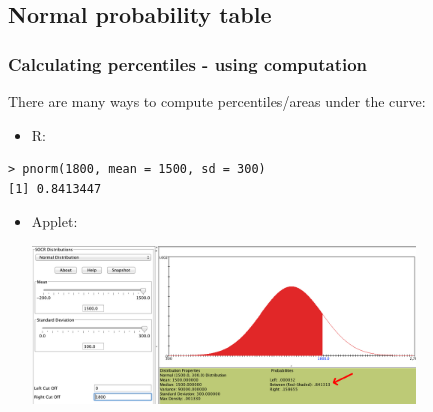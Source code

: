 
%
%
%
%
%
%

\subsection{Normal probability table}


\begin{frame}[fragile]
\frametitle{Calculating percentiles - using computation}

There are many ways to compute percentiles/areas under the curve:

\begin{itemize}
\item R:
\end{itemize}
\begin{beamerboxesrounded}[shadow = false, lower = code body]{}
{\small \begin{verbatim}
> pnorm(1800, mean = 1500, sd = 300)
[1] 0.8413447
\end{verbatim}
}
\end{beamerboxesrounded}
\begin{itemize}
\item Applet: {\small {}}
\begin{center}
\includegraphics[width=0.8\textwidth]{3-1_normal_distribution/figures/applet}
\end{center}

\end{itemize}


\end{frame}

